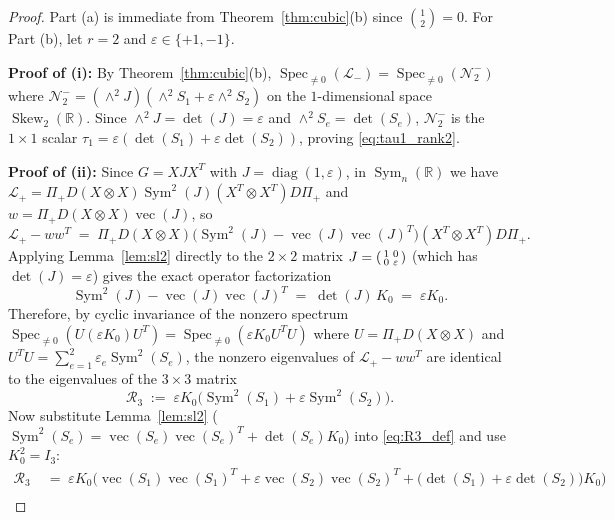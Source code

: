 \documentclass[11pt,a4paper]{article}
\theoremstyle{plain}
\theoremstyle{definition}
\theoremstyle{remark}
\DeclareMathOperator{\Spec}{Spec}
\DeclareMathOperator{\Sym}{Sym}
\DeclareMathOperator{\Skew}{Skew}
\DeclareMathOperator{\vecop}{vec}
\DeclareMathOperator{\diag}{diag}
\begin{document}
\begin{proof}
Part (a) is immediate from Theorem~\ref{thm:cubic}(b) since $\binom{1}{2} = 0$. For Part (b), let $r = 2$ and $\varepsilon \in \{+1, -1\}$.

\textbf{Proof of (i):} By Theorem~\ref{thm:cubic}(b), $\Spec_{\ne 0}(\mathcal{L}_-) = \Spec_{\ne 0}(\mathcal{N}_2^-)$ where $\mathcal{N}_2^- = (\wedge^2 J)(\wedge^2 S_1 + \varepsilon \wedge^2 S_2)$ on the $1$-dimensional space $\Skew_2(\mathbb{R})$. Since $\wedge^2 J = \det(J) = \varepsilon$ and $\wedge^2 S_e = \det(S_e)$, $\mathcal{N}_2^-$ is the $1 \times 1$ scalar $\tau_1 = \varepsilon(\det(S_1) + \varepsilon \det(S_2))$, proving \eqref{eq:tau1_rank2}.

\textbf{Proof of (ii):} Since $G = X J X^T$ with $J = \diag(1, \varepsilon)$, in $\Sym_n(\mathbb{R})$ we have $\mathcal{L}_+ = \Pi_+ D (X \otimes X)\Sym^2(J)(X^T \otimes X^T) D \Pi_+$ and $w = \Pi_+ D (X \otimes X)\vecop(J)$, so
\[
  \mathcal{L}_+ - w w^T \;=\; \Pi_+ D (X \otimes X)\Big(\Sym^2(J) - \vecop(J)\vecop(J)^T\Big)(X^T \otimes X^T) D \Pi_+.
\]
Applying Lemma~\ref{lem:sl2} directly to the $2 \times 2$ matrix $J = \begin{psmallmatrix} 1 & 0 \\ 0 & \varepsilon \end{psmallmatrix}$ (which has $\det(J) = \varepsilon$) gives the exact operator factorization
\begin{equation}\label{eq:Sym2J_factorization}
  \boxed{\Sym^2(J) - \vecop(J)\vecop(J)^T \;=\; \det(J)\, K_0 \;=\; \varepsilon K_0.}
\end{equation}
Therefore, by cyclic invariance of the nonzero spectrum $\Spec_{\ne 0}(U (\varepsilon K_0) U^T) = \Spec_{\ne 0}(\varepsilon K_0 U^T U)$ where $U = \Pi_+ D (X \otimes X)$ and $U^T U = \sum_{e=1}^2 \varepsilon_e \Sym^2(S_e)$, the nonzero eigenvalues of $\mathcal{L}_+ - w w^T$ are identical to the eigenvalues of the $3 \times 3$ matrix
\begin{equation}\label{eq:R3_def}
  \mathcal{R}_3 \;:=\; \varepsilon K_0 \Big(\Sym^2(S_1) + \varepsilon \Sym^2(S_2)\Big).
\end{equation}
Now substitute Lemma~\ref{lem:sl2} ($\Sym^2(S_e) = \vecop(S_e)\vecop(S_e)^T + \det(S_e)K_0$) into \eqref{eq:R3_def} and use $K_0^2 = I_3$:
\begin{align}
  \mathcal{R}_3 &\;=\; \varepsilon K_0 \Big(\vecop(S_1)\vecop(S_1)^T + \varepsilon \vecop(S_2)\vecop(S_2)^T + \big(\det(S_1) + \varepsilon \det(S_2)\big)K_0\Big) \nonumber\\

\end{align}
\end{proof}
\end{document}
